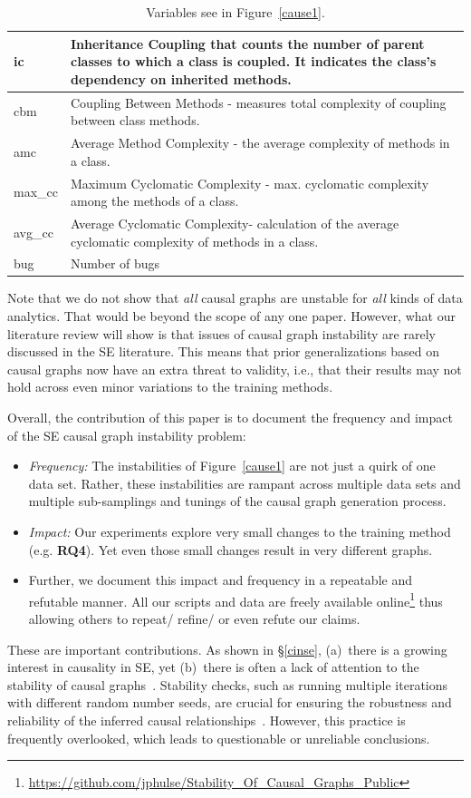 \documentclass[]{svjour3}
\begin{document}
\begin{table}
\begin{tabular}{|l|p{10.65cm}|}
ic & Inheritance Coupling that counts the number of parent classes to which a class is coupled. It indicates the class's dependency on inherited methods.\\ \hline
cbm & Coupling Between Methods - measures total complexity of coupling between class methods.\\ \hline
amc & Average Method Complexity -   the average complexity of methods in a class. \\ \hline
max\_cc & Maximum Cyclomatic Complexity -   max. cyclomatic complexity among the methods of a class. \\ \hline
avg\_cc & Average Cyclomatic Complexity- calculation of the average cyclomatic complexity of methods in a class. \\ \hline
bug & Number of bugs \\ \hline
\end{tabular}
\caption{Variables see in Figure~\ref{cause1}.}\label{words}
\end{table}

Note that we do not show that {\em all} causal graphs are unstable for {\em all} kinds of data analytics. That would be beyond the scope of any one paper. However, what our literature review will show is that issues of causal graph instability are rarely discussed in the SE literature. This means that prior generalizations based on causal graphs now have an extra threat to validity, i.e., that their results may not hold across even minor variations to the training methods. 

 Overall, the contribution of this paper is to document the   frequency and impact  of the SE causal graph instability problem: 
   \begin{itemize}
       \item
        {\em Frequency:}  
      The instabilities of Figure~\ref{cause1} are not just a quirk of one data set.
         Rather, these instabilities are rampant across multiple data sets and multiple sub-samplings and tunings of the causal graph generation process.
         \item {\em Impact:} Our experiments explore very small changes to the training method (e.g. {\bf RQ4}). Yet even those small changes result in very different graphs.  
         \item Further, we document this impact and frequency in a repeatable and refutable
         manner. All our scripts and data are freely available online\footnote{ {\url{https://github.com/jphulse/Stability_Of_Causal_Graphs_Public}}}  thus allowing
         others to repeat/ refine/ or even refute our claims.
     \end{itemize}
These are important contributions.    As shown in \S\ref{cinse},   (a)~there is a growing interest in causality in SE, yet (b)~there is often a lack of attention to the stability of causal graphs~\cite{gamella2020active}. 
Stability checks, such as running multiple iterations with different random number seeds, are crucial for ensuring the robustness and reliability of the inferred causal relationships~\cite{elwert2013graphical}. 
However, this practice is frequently overlooked, which leads to questionable or unreliable conclusions.
\end{document}
